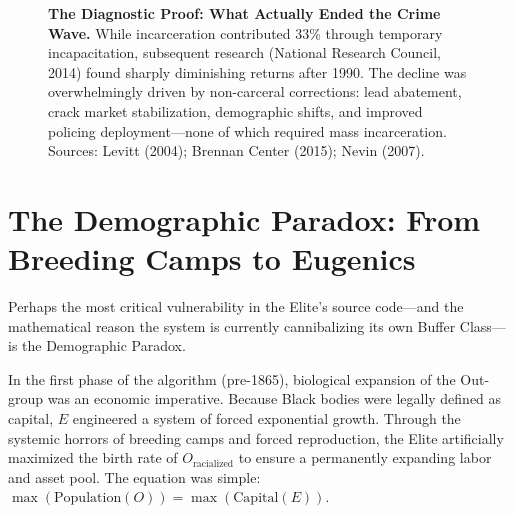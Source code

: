 \documentclass[12pt,openany]{book}
\begin{document}
\begin{figure}[htbp]
\centering
{}
\caption{\textbf{The Diagnostic Proof: What Actually Ended the Crime Wave.} While incarceration contributed 33\% through temporary incapacitation, subsequent research (National Research Council, 2014) found sharply diminishing returns after 1990. The decline was overwhelmingly driven by non-carceral corrections: lead abatement, crack market stabilization, demographic shifts, and improved policing deployment---none of which required mass incarceration. Sources: Levitt (2004); Brennan Center (2015); Nevin (2007).}
\label{fig:crime_decline}
\end{figure}

\section{The Demographic Paradox: From Breeding Camps to Eugenics}

Perhaps the most critical vulnerability in the Elite's source code---and the mathematical reason the system is currently cannibalizing its own Buffer Class---is the Demographic Paradox.

In the first phase of the algorithm (pre-1865), biological expansion of the Out-group was an economic imperative. Because Black bodies were legally defined as capital, $E$ engineered a system of forced exponential growth. Through the systemic horrors of breeding camps and forced reproduction, the Elite artificially maximized the birth rate of $O_{\text{racialized}}$ to ensure a permanently expanding labor and asset pool. The equation was simple: $\max(\text{Population}(O)) = \max(\text{Capital}(E))$.
\end{document}
